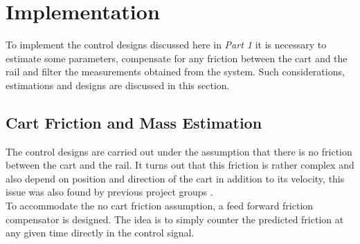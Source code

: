 \chapter{Implementation}
To implement the control designs discussed here in \textit{Part 1} it is necessary to estimate some parameters, compensate for any friction between the cart and the rail and filter the measurements obtained from the system. Such considerations, estimations and designs are discussed in this section.

\section{Cart Friction and Mass Estimation}
The control designs are carried out under the assumption that there is no friction between the cart and the rail. It turns out that this friction is rather complex and also depend on position and direction of the cart in addition to its velocity, this issue was also found by previous project groups \cite{JHHorgensen}.\\
To accommodate the no cart friction assumption, a feed forward friction compensator is designed. The idea is to simply counter the predicted friction at any given time directly in the control signal.

